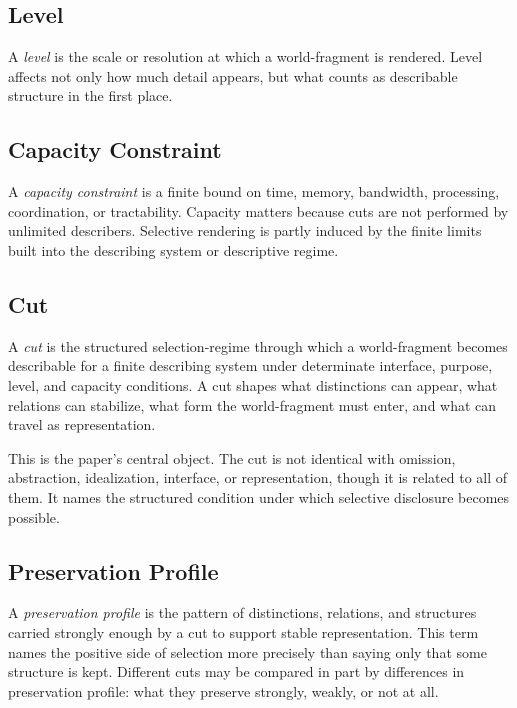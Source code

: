 \documentclass[11pt]{article}
\renewcommand{\emph}[1]{\textit{#1}}
\begin{document}
\subsection{Level}

A \emph{level} is the scale or resolution at which a world-fragment is rendered. Level affects not only how much detail appears, but what counts as describable structure in the first place. \cite{levels_org_biology_sep}

\subsection{Capacity Constraint}

A \emph{capacity constraint} is a finite bound on time, memory, bandwidth, processing, coordination, or tractability. Capacity matters because cuts are not performed by unlimited describers. Selective rendering is partly induced by the finite limits built into the describing system or descriptive regime.

\subsection{Cut}

A \emph{cut} is the structured selection-regime through which a world-fragment becomes describable for a finite describing system under determinate interface, purpose, level, and capacity conditions. A cut shapes what distinctions can appear, what relations can stabilize, what form the world-fragment must enter, and what can travel as representation.

This is the paper's central object. The cut is not identical with omission, abstraction, idealization, interface, or representation, though it is related to all of them. It names the structured condition under which selective disclosure becomes possible.

\subsection{Preservation Profile}

A \emph{preservation profile} is the pattern of distinctions, relations, and structures carried strongly enough by a cut to support stable representation. This term names the positive side of selection more precisely than saying only that some structure is kept. Different cuts may be compared in part by differences in preservation profile: what they preserve strongly, weakly, or not at all.
\end{document}
